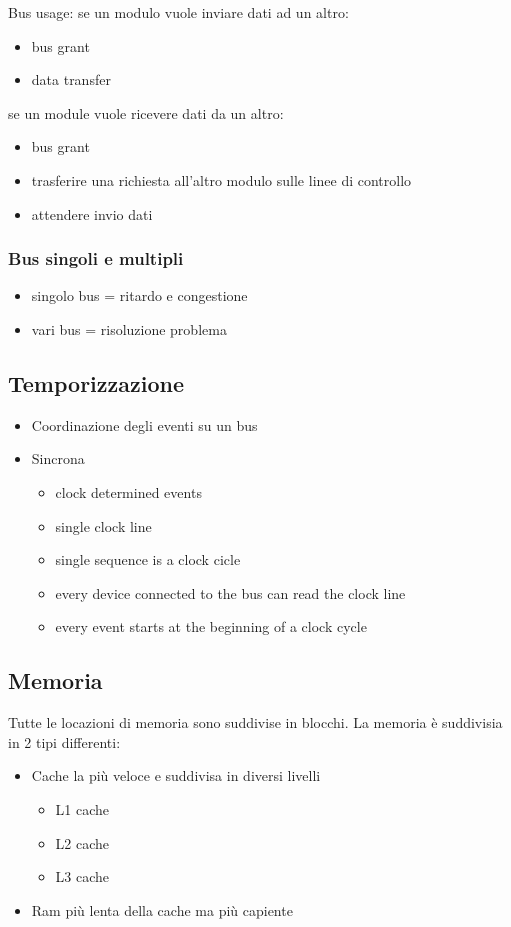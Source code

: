 \documentclass[12pt, a4paper]{article}
\begin{document}
Bus usage:
se un modulo vuole inviare dati ad un altro:
\begin{itemize}
	\item bus grant
	\item data transfer
\end{itemize}

se un module vuole ricevere dati da un altro:
\begin{itemize}
	\item bus grant
	\item trasferire una richiesta all'altro modulo sulle linee di controllo 
	\item attendere invio dati
\end{itemize}

\subsubsection{Bus singoli e multipli}
\begin{itemize}
	\item singolo bus = ritardo e congestione
	\item vari bus = risoluzione problema
\end{itemize}

\subsection{Temporizzazione}
\begin{itemize}
	\item Coordinazione degli eventi su un bus
	\item Sincrona
	\begin{itemize}
		\item clock determined events
		\item single clock line
		\item single sequence is a clock cicle
		\item every device connected to the bus can read the clock line
		\item every event starts at the beginning of a clock cycle
	\end{itemize}
\end{itemize}

\subsection{Memoria}
Tutte le locazioni di memoria sono suddivise in blocchi. \newline
La memoria è suddivisia in 2 tipi differenti:
\begin{itemize}
	\item Cache la più veloce e suddivisa in diversi livelli
		\begin{itemize}
			\item L1 cache
			\item L2 cache
			\item L3 cache
		\end{itemize}
	\item Ram più lenta della cache ma più capiente
\end{itemize}
\end{document}
